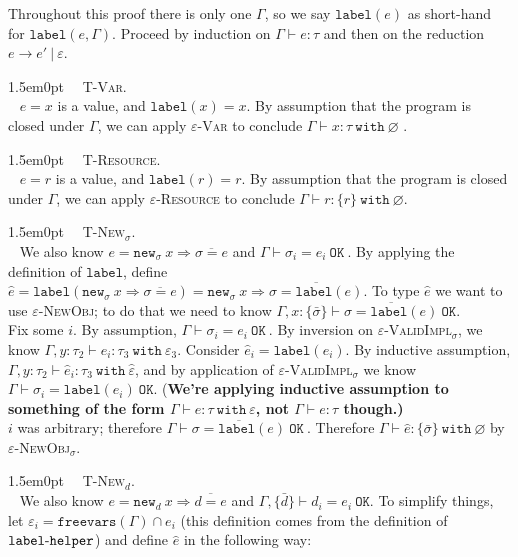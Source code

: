 \documentclass{llncs}
\newcommand{\keywadj}[1]{\mathtt{#1}}
\newcommand{\keyw}[1]{\keywadj{#1}~}
\newcommand{\kw}[1]{\keyw{ #1 }}
\newcommand{\kwa}[1]{\keywadj{ #1 }}
\newcommand{\hyphen}{\hbox{-}}
\newcommand{\proofcase}[2]{
	\begin{adjustwidth}{1.5em}{0pt}
		\fbox{Case.}~~#1. \\ ~#2
	\end{adjustwidth}
}
\newcommand{\type}[2]{
	#1~\keyw{with} #2
}
\newcommand{\newd}[0]{
	\keywadj{new}_d~x \Rightarrow \overline{d = e}
}
\newcommand{\newsig}[0]{
	\keywadj{new}_\sigma~x \Rightarrow \overline{\sigma = e}
}
\begin{document}
{Throughout this proof there is only one $\Gamma$, so we say $\kwa{label}(e)$ as short-hand for $\kwa{label}(e, \Gamma)$. Proceed by induction on $\Gamma \vdash e : \tau$ and then on the reduction $e \longrightarrow e'~|~\varepsilon$.\\

\proofcase{\textsc{T-Var}}{
$e = x$ is a value, and $\kwa{label}(x) = x$. By assumption that the program is closed under $\Gamma$, we can apply \textsc{$\varepsilon$-Var} to conclude $\Gamma \vdash x : \type{\tau}{\varnothing}$ .\\
}

\proofcase{\textsc{T-Resource}}{
$e = r$ is a value, and $\kwa{label}(r) = r$. By assumption that the program is closed under $\Gamma$, we can apply \textsc{$\varepsilon$-Resource} to conclude $\Gamma \vdash r : \type{\{ r \}}{\varnothing}$.\\
}


\proofcase{\textsc{T-New$_\sigma$}}{
We also know $e = \newsig$ and $\Gamma \vdash \sigma_i = e_i~\kw{OK}$. By applying the definition of $\kwa{label}$, define $\hat e = \kwa{label}(\newsig) = \kwa{new}_\sigma~x \Rightarrow \overline{\sigma = \kwa{label}(e)}$. To type $\hat e$ we want to use \textsc{$\varepsilon$-NewObj}; to do that we need to know $\Gamma, x : \{ \bar \sigma \} \vdash \overline{ \sigma = \kwa{label}(e) }~\kwa{OK}$.\\

\noindent
Fix some $i$. By assumption, $\Gamma \vdash \sigma_i = e_i~\kw{OK}$. By inversion on \textsc{$\varepsilon$-ValidImpl$_\sigma$}, we know $\Gamma, y : \tau_2 \vdash e_i : \type{\tau_3}{\varepsilon_3}$. Consider $\hat e_i = \kwa{label}(e_i)$. By inductive assumption, $\Gamma, y : \tau_2 \vdash \hat e_i : \type{\tau_3}{\hat \varepsilon}$, and by application of \textsc{$\varepsilon$-ValidImpl$_\sigma$} we know $\Gamma \vdash \sigma_i = \kwa{label}(e_i)~\kwa{OK}$. (\textbf{We're applying inductive assumption to something of the form $\Gamma \vdash e : \type{\tau}{\varepsilon}$, not $\Gamma \vdash e : \tau$ though.)}\\

\noindent
$i$ was arbitrary; therefore $\Gamma \vdash \overline{\sigma = \kwa{label}(e)}~\kw{OK}$. Therefore $\Gamma \vdash \hat e : \{ \bar \sigma \}~\kw{with} \varnothing$ by \textsc{$\varepsilon$-NewObj$_\sigma$}.\\
}


\proofcase{\textsc{T-New$_d$}}{
We also know $e = \newd$ and $\Gamma, \{ \bar d \} \vdash d_i = e_i~\kwa{OK}$. To simplify things, let $\varepsilon_i = \kwa{freevars}(\Gamma) \cap e_i$ (this definition comes from the definition of $\kwa{label \hyphen helper}$) and define $\hat e$ in the following way:

}}
\end{document}
